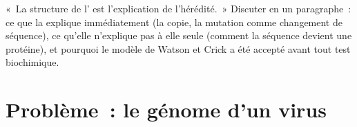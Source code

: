 \begin{exercise}[$\star\star\star$]\label{exo:b1:nucleic-acids:12}
«~La structure de l' est l'explication de l'hérédité.~» Discuter en
un paragraphe~: ce que la  explique immédiatement (la
copie, la mutation comme changement de séquence), ce qu'elle n'explique
pas à elle seule (comment la séquence devient une protéine), et pourquoi
le modèle de Watson et Crick a été accepté avant tout test biochimique.
\end{exercise}

\section{Problème~: le génome d'un virus}

